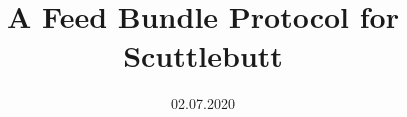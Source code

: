 \documentclass[a4paper, 10pt, oneside]{memoir}
\title				{A Feed Bundle Protocol for Scuttlebutt}
\date				{02.07.2020}
\begin{document}

\thesisfront
\maketitle
\pagestyle{thesis}


\thesistoc
\thesismain











%
%
%
%
\thesisappendix
\thesisbib
\begin{appendices}
	 
\end{appendices}
\thesisback

\end{document}
